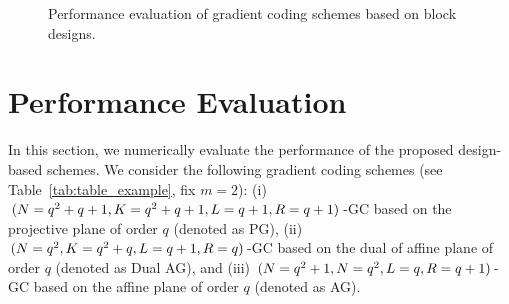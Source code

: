 \documentclass[conference,letterpaper]{IEEEtran}
\begin{document}
\begin{figure}[!ht]
     \hfil
     \caption{Performance evaluation of gradient coding schemes based on block designs.}
     \label{fig:numerical}
\end{figure}


\section{Performance Evaluation}
\label{sec:numerical}

In this section, we numerically evaluate the performance of the proposed design-based schemes. 
We consider the following gradient coding schemes (see Table~\ref{tab:table_example}, fix $m = 2$): (i) $(N = q^2+q+1, K = q^2+q+1, L = q+1, R = q+1)$-GC based on the projective plane of order $q$ (denoted as PG), (ii) $(N = q^2, K = q^2+q, L = q+1, R = q)$-GC based on the dual of affine plane of order $q$ (denoted as Dual AG), and (iii) $(N = q^2+1, N = q^2, L = q, R = q+1)$-GC based on the affine plane of order $q$ (denoted as AG).  
\end{document}
